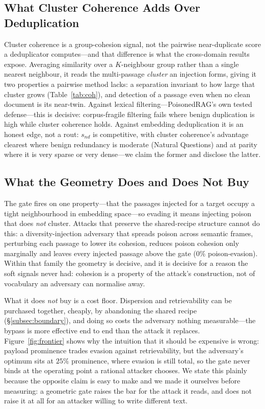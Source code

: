 \documentclass[10pt,journal,compsoc]{IEEEtran}
\begin{document}
\subsection{What Cluster Coherence Adds Over Deduplication}
Cluster coherence is a group-cohesion signal, not the pairwise near-duplicate score a
deduplicator computes---and that difference is what the cross-domain results expose. Averaging
similarity over a $K$-neighbour group rather than a single nearest neighbour, it reads the
multi-passage \emph{cluster} an injection forms, giving it two properties a pairwise method
lacks: a separation invariant to how large that cluster grows (Table~\ref{tab:coh}), and
detection of a passage even when no clean document is its near-twin. Against lexical
filtering---PoisonedRAG's own tested defense---this is decisive: corpus-fragile filtering fails
where benign duplication is high while cluster coherence holds. Against embedding deduplication
it is an honest edge, not a rout: $s_{nd}$ is competitive, with cluster coherence's advantage
clearest where benign redundancy is moderate (Natural Questions) and at parity where it is very
sparse or very dense---we claim the former and disclose the latter.

\subsection{What the Geometry Does and Does Not Buy}
The gate fires on one property---that the passages injected for a target occupy a tight
neighbourhood in embedding space---so evading it means injecting poison that does \emph{not}
cluster. Attacks that preserve the shared-recipe structure cannot do this: a diversity-injection
adversary that spreads poison across semantic frames, perturbing each passage to lower its
cohesion, reduces poison cohesion only marginally and leaves every injected passage above the
gate ($0\%$ poison-evasion). Within that family the geometry is decisive, and it is decisive for
a reason the soft signals never had: cohesion is a property of the attack's construction, not of
vocabulary an adversary can normalise away.

What it does \emph{not} buy is a cost floor. Dispersion and retrievability can be purchased
together, cheaply, by abandoning the shared recipe (\S\ref{subsec:boundary}), and doing so costs
the adversary nothing measurable---the bypass is more effective end to end than the attack it
replaces. Figure~\ref{fig:frontier} shows why the intuition that it should be expensive is
wrong: payload prominence trades evasion against retrievability, but the adversary's optimum
sits at $25\%$ prominence, where evasion is still total, so the gate never binds at the
operating point a rational attacker chooses. We state this plainly because the opposite claim is
easy to make and we made it ourselves before measuring: a geometric gate raises the bar for the
attack it reads, and does not raise it at all for an attacker willing to write different text.
\end{document}
